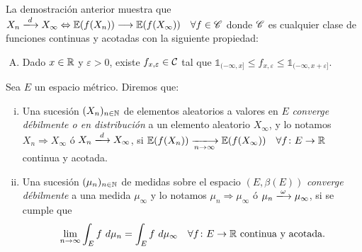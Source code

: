 \begin{remark}
	La demostración anterior muestra que $X_{n} \xlongrightarrow{d} X_{\infty} \iff \mbb{E}(f(X_{n})) \longrightarrow \mbb{E}(f(X_{\infty})) \quad \forall f \in \mscr{C}$ donde $\mathscr{C}$ es cualquier clase de funciones continuas y acotadas con la siguiente propiedad:
	\begin{enumerate}[(A)]
		\item Dado $x \in \mathbb{R}$ y $\varepsilon > 0$, existe $f_{x, \varepsilon} \in \mathcal{C}$ tal que $\mathds{1}_{(-\infty,x]} \leq f_{x, \varepsilon} \leq \mathds{1}_{(-\infty, x + \varepsilon]}$.
	\end{enumerate}
\end{remark}

\begin{definition}
	Sea $E$ un espacio métrico. Diremos que:
	\begin{enumerate}[i)]
		\item Una sucesión $(X_{n})_{n \in \mathbb{N}}$ de elementos aleatorios a valores en $E$ \textit{converge débilmente o en distribución} a un elemento aleatorio $X_{\infty}$, y lo notamos $X_{n} \Longrightarrow X_{\infty}$ ó $X_{n} \xlongrightarrow{d} X_{\infty}$, si $\mbb{E}(f(X_{n})) \xlongrightarrow[n \to \infty]{} \mbb{E}(f(X_{\infty})) \quad \forall f \colon E \to \R$ continua y acotada.

		\item Una sucesión $(\mu_{n})_{n \in \mathbb{N}}$ de medidas sobre el espacio $(E, \beta(E))$ \textit{converge débilmente} a una medida $\mu_{\infty}$ y lo notamos $\mu_{n} \Longrightarrow \mu_{\infty}$ ó $\mu_{n} \xlongrightarrow{\omega} \mu_{\infty}$, si se cumple que
		\[ \lim_{n \to \infty} \int_{E} f \ d \mu_{n} = \int_{E} f \ d\mu_{\infty} \quad \forall f \colon E \to \mathbb{R} \text{ continua y acotada}. \]
	\end{enumerate}
\end{definition}

